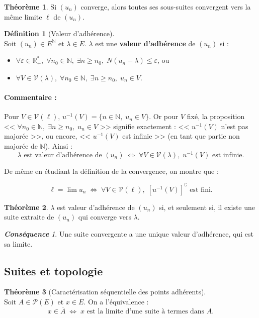 \documentclass[12pt]{book}
\let\ensembleNombre\mathbb
\newcommand*\N{\ensuremath{\ensembleNombre{N}}}
\newcommand*\R{\ensuremath{\ensembleNombre{R}}}
\theoremstyle{definition}
\newtheorem*{defi}{Définition}
\newtheorem{thme}{Théorème}[chapter]
\theoremstyle{remark}
\newtheorem*{cons}{\textbf{Conséquence}}
\newenvironment{fdef}
  {\begin{mdframed}[roundcorner=10pt, linewidth=1pt]\begin{defi}}
  {\end{defi}\end{mdframed}}
\newenvironment{fthme}
  {\begin{mdframed}[roundcorner=10pt, linewidth=2pt]\begin{thme}}
  {\end{thme}\end{mdframed}}
\begin{document}
	\begin{fthme}
	Si $(u_n)$ converge, alors toutes ses sous-suites convergent vers la même limite $\ell$ de $(u_n)$.
	\end{fthme}
	
	\begin{fdef}[Valeur d'adhérence]\mbox{~}\\
	Soit $(u_n) \in E^\N$ et $\lambda \in E$. $\lambda$ est une \textbf{valeur d'adhérence} de $(u_n)$ si :
	\begin{itemize}
	\item $\forall \varepsilon \in \R_+^*,\; \forall n_0 \in \N,\; \exists n \geq n_0, \; N(u_n-\lambda) \leq \varepsilon$, ou
	\item $\forall V \in \mathcal V(\lambda), \; \forall n_0 \in \N, \; \exists n\geq n_0, \; u_n \in V$.
	\end{itemize}
	\end{fdef}
	
	\paragraph{Commentaire :} Pour $V \in \mathcal V(\ell)$, $u^{-1}(V) = \lbrace n \in \N,\; u_n \in V \rbrace$. Or pour $V$ fixé, la proposition << $\forall n_0 \in \N,\; \exists n\geq n_0,\; u_n \in V$ >> signifie exactement : << $u^{-1}(V)$ n'est pas majorée >>, ou encore, << $u^{-1}(V)$ est infinie >> (en tant que partie non majorée de $\N$). Ainsi :
	\[ \lambda \text{ est valeur d'adhérence de } (u_n) \;\Longleftrightarrow\; \forall V \in \mathcal V(\lambda), \; u^{-1}(V) \text{ est infinie.} \]
	
	De même en étudiant la définition de la convergence, on montre que :
	
	\[ \ell = \lim u_n \;\Longleftrightarrow\; \forall V \in \mathcal V(\ell),\; \left[ u^{-1}(V) \right]^\complement \text{ est fini.} \]
	
	\begin{fthme}
	$\lambda$ est valeur d'adhérence de $(u_n)$ si, et seulement si, il existe une suite extraite de $(u_n)$ qui converge vers $\lambda$.
	\end{fthme}
	
	\begin{cons}
	Une suite convergente a une unique valeur d'adhérence, qui est sa limite.
	\end{cons}\newpage
	
	\subsection{Suites et topologie}
	\begin{fthme}[Caractérisation séquentielle des points adhérents]\mbox{~}\\
	Soit $A \in \mathcal P(E)$ et $x \in E$. On a l'équivalence :
	\[ x \in \overline A \;\Longleftrightarrow\; x \text{ est la limite d'une suite à termes dans } A.  \]
	\end{fthme}
	
\end{document}
